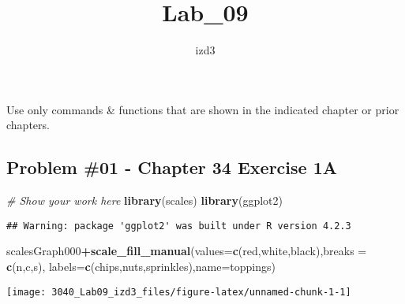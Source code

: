 \documentclass[
]{article}
\title{Lab\_09}
\author{izd3}
\date{}
\newenvironment{Shaded}{\begin{snugshade}}{\end{snugshade}}
\newcommand{\AttributeTok}[1]{\textcolor[rgb]{0.13,0.29,0.53}{#1}}
\newcommand{\CommentTok}[1]{\textcolor[rgb]{0.56,0.35,0.01}{\textit{#1}}}
\newcommand{\FunctionTok}[1]{\textcolor[rgb]{0.13,0.29,0.53}{\textbf{#1}}}
\newcommand{\NormalTok}[1]{#1}
\newcommand{\SpecialCharTok}[1]{\textcolor[rgb]{0.81,0.36,0.00}{\textbf{#1}}}
\newcommand{\StringTok}[1]{\textcolor[rgb]{0.31,0.60,0.02}{#1}}
\begin{document}
\maketitle

Use only commands \& functions that are shown in the indicated chapter
or prior chapters.

\newpage

\hypertarget{problem-01---chapter-34-exercise-1a}{%
\subsection{Problem \#01 - Chapter 34 Exercise
1A}\label{problem-01---chapter-34-exercise-1a}}

\begin{Shaded}
\begin{Highlighting}[]
\CommentTok{\# Show your work here}
\FunctionTok{library}\NormalTok{(scales)}
\FunctionTok{library}\NormalTok{(ggplot2)}
\end{Highlighting}
\end{Shaded}

\begin{verbatim}
## Warning: package 'ggplot2' was built under R version 4.2.3
\end{verbatim}

\begin{Shaded}
\begin{Highlighting}[]
\NormalTok{scalesGraph000}\SpecialCharTok{+}\FunctionTok{scale\_fill\_manual}\NormalTok{(}\AttributeTok{values=}\FunctionTok{c}\NormalTok{(}\StringTok{\textquotesingle{}red\textquotesingle{}}\NormalTok{,}\StringTok{\textquotesingle{}white\textquotesingle{}}\NormalTok{,}\StringTok{\textquotesingle{}black\textquotesingle{}}\NormalTok{),}\AttributeTok{breaks =} \FunctionTok{c}\NormalTok{(}\StringTok{\textquotesingle{}n\textquotesingle{}}\NormalTok{,}\StringTok{\textquotesingle{}c\textquotesingle{}}\NormalTok{,}\StringTok{\textquotesingle{}s\textquotesingle{}}\NormalTok{),}
                                 \AttributeTok{labels=}\FunctionTok{c}\NormalTok{(}\StringTok{\textquotesingle{}chips\textquotesingle{}}\NormalTok{,}\StringTok{\textquotesingle{}nuts\textquotesingle{}}\NormalTok{,}\StringTok{\textquotesingle{}sprinkles\textquotesingle{}}\NormalTok{),}\AttributeTok{name=}\StringTok{\textquotesingle{}toppings\textquotesingle{}}\NormalTok{)}
\end{Highlighting}
\end{Shaded}

\texttt{[image: 3040\_Lab09\_izd3\_files/figure-latex/unnamed-chunk-1-1]}
\end{document}
